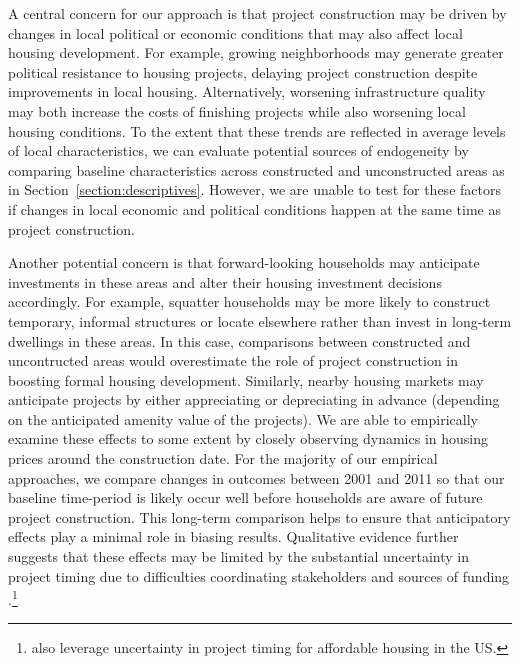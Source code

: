\documentclass[12pt]{article}
\begin{document}
A central concern for our approach is that project construction may be driven by changes in local political or economic conditions that may also affect local housing development.  For example, growing neighborhoods may generate greater political resistance to housing projects, delaying project construction despite improvements in local housing.  Alternatively, worsening infrastructure quality may both increase the costs of finishing projects while also worsening local housing conditions.  To the extent that these trends are reflected in average levels of local characteristics, we can evaluate potential sources of endogeneity by comparing baseline characteristics across constructed and unconstructed areas as in Section~\ref{section:descriptives}.  However, we are unable to test for these factors if changes in local economic and political conditions happen at the same time as project construction.

Another potential concern is that forward-looking households may anticipate investments in these areas and alter their housing investment decisions accordingly.  For example, squatter households may be more likely to construct temporary, informal structures or locate elsewhere rather than invest in long-term dwellings in these areas.  In this case, comparisons between constructed and uncontructed areas would overestimate the role of project construction in boosting formal housing development.  Similarly, nearby housing markets may anticipate projects by either appreciating or depreciating in advance (depending on the anticipated amenity value of the projects).  We are able to empirically examine these effects to some extent by closely observing dynamics in housing prices around the construction date.  For the majority of our empirical approaches, we compare changes in outcomes between 2001 and 2011 so that our baseline time-period is likely occur well before households are aware of future project construction.  This long-term comparison helps to ensure that anticipatory effects play a minimal role in biasing results.  Qualitative evidence further suggests that these effects may be limited by the substantial uncertainty in project timing due to difficulties coordinating stakeholders and sources of funding \citep{serihistory}.\footnote{\cite{diamond2016wants} also leverage uncertainty in project timing for affordable housing in the US.}
\end{document}
